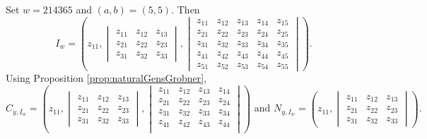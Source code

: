 \documentclass[12pt,reqno]{amsart}
\newtheorem{Main Conjecture}[theorem]{Main Conjecture}
\theoremstyle{remark}
\newenvironment{example}
  {\pushQED{\qed}\renewcommand{\qedsymbol}{$\diamondsuit$}\examplex}
  {\popQED\endexamplex}
\theoremstyle{plain}
\begin{document}
\begin{example}\label{ex:idealRecursion}
Set $w = 214365$ and $(a,b) = (5,5)$.  Then \[
I_w = \left(z_{11}, \begin{vmatrix} z_{11} & z_{12} & z_{13} \\
z_{21} & z_{22} & z_{23} \\
z_{31} & z_{32} & z_{33} 
 \end{vmatrix}, \begin{vmatrix} z_{11} & z_{12} & z_{13} & z_{14} & z_{15} \\
 z_{21} & z_{22} & z_{23} & z_{24} & z_{25}  \\
 z_{31} & z_{32} & z_{33} & z_{34} & z_{35} \\
  z_{41} & z_{42} & z_{43} & z_{44} & z_{45}  \\
 z_{51} & z_{52} & z_{53} & z_{54} & z_{55} 
 \end{vmatrix}\right).
\]  Using Proposition \ref{prop:naturalGensGrobner}, \[
C_{y,I_w} = \left(z_{11}, \begin{vmatrix} z_{11} & z_{12} & z_{13} \\
z_{21} & z_{22} & z_{23} \\
z_{31} & z_{32} & z_{33} 
 \end{vmatrix}, \begin{vmatrix} z_{11} & z_{12} & z_{13} & z_{14} \\
 z_{21} & z_{22} & z_{23} & z_{24}\\
 z_{31} & z_{32} & z_{33} & z_{34} \\
  z_{41} & z_{42} & z_{43} & z_{44}  \\
 \end{vmatrix}\right) \mbox{ and } N_{y,I_w} = \left(z_{11}, \begin{vmatrix} z_{11} & z_{12} & z_{13} \\
z_{21} & z_{22} & z_{23} \\
z_{31} & z_{32} & z_{33} 
 \end{vmatrix}\right).
\]


\end{example}
\end{document}
